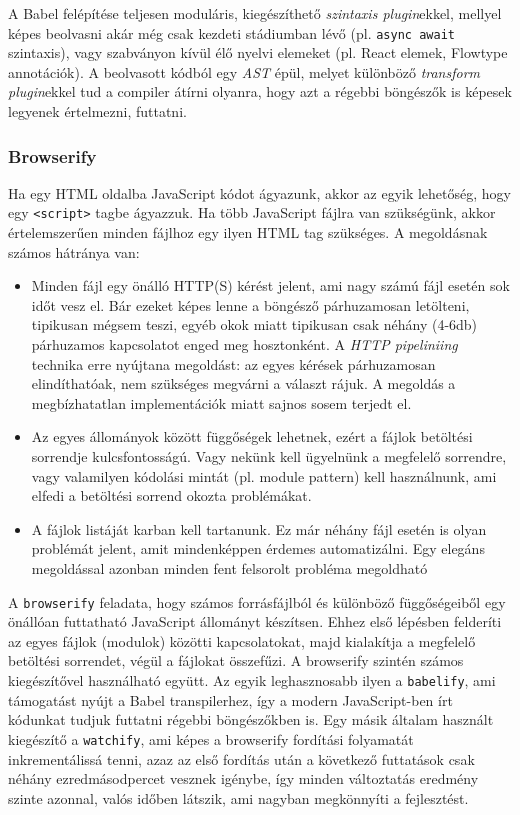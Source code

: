 A Babel felépítése teljesen moduláris, kiegészíthető \emph{szintaxis
  plugin}ekkel, mellyel képes beolvasni akár még csak kezdeti stádiumban lévő
(pl. \texttt{async await} szintaxis), vagy szabványon kívül élő nyelvi elemeket
(pl. React elemek, Flowtype annotációk).  A beolvasott kódból egy \emph{AST}
épül, melyet különböző \emph{transform plugin}ekkel tud a compiler átírni
olyanra, hogy azt a régebbi böngészők is képesek legyenek értelmezni, futtatni.

\subsubsection{Browserify}

Ha egy HTML oldalba JavaScript kódot ágyazunk, akkor az egyik lehetőség, hogy
egy \texttt{<script>} tagbe ágyazzuk. Ha több JavaScript fájlra van szükségünk,
akkor értelemszerűen minden fájlhoz egy ilyen HTML tag szükséges.  A megoldásnak
számos hátránya van:

\begin{itemize}
\item Minden fájl egy önálló HTTP(S) kérést jelent, ami nagy számú fájl esetén
  sok időt vesz el. Bár ezeket képes lenne a böngésző párhuzamosan letölteni,
  tipikusan mégsem teszi, egyéb okok miatt tipikusan csak néhány (4-6db)
  párhuzamos kapcsolatot enged meg hosztonként.  A \emph{HTTP pipeliniing}
  technika erre nyújtana megoldást: az egyes kérések párhuzamosan
  elindíthatóak, nem szükséges megvárni a választ rájuk. A
  megoldás a megbízhatatlan implementációk miatt sajnos sosem terjedt el.
\item Az egyes állományok között függőségek lehetnek, ezért a fájlok betöltési
  sorrendje kulcsfontosságú. Vagy nekünk kell ügyelnünk a megfelelő sorrendre,
  vagy valamilyen kódolási mintát (pl. module pattern) kell használnunk, ami
  elfedi a betöltési sorrend okozta problémákat.
\item A fájlok listáját karban kell tartanunk. Ez már néhány fájl esetén is
  olyan problémát jelent, amit mindenképpen érdemes automatizálni. Egy elegáns
  megoldással azonban minden fent felsorolt probléma megoldható
\end{itemize}

A \texttt{browserify} feladata, hogy számos forrásfájlból és különböző
függőségeiből egy önállóan futtatható JavaScript állományt készítsen.  Ehhez
első lépésben felderíti az egyes fájlok (modulok) közötti kapcsolatokat, majd
kialakítja a megfelelő betöltési sorrendet, végül a fájlokat összefűzi.  A
browserify szintén számos kiegészítővel használható együtt.  Az egyik
leghasznosabb ilyen a \texttt{babelify}, ami támogatást nyújt a Babel
transpilerhez, így a modern JavaScript-ben írt kódunkat tudjuk futtatni régebbi böngészőkben is.
Egy másik általam használt kiegészítő a \texttt{watchify}, ami képes
a browserify fordítási folyamatát inkrementálissá tenni, azaz az első fordítás
után a következő futtatások csak néhány ezredmásodpercet vesznek igénybe, így
minden változtatás eredmény szinte azonnal, valós időben látszik, ami
nagyban megkönnyíti a fejlesztést.

